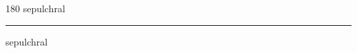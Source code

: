 
\begin{frame}
\begin{center}
\begin{turn}{180}
{\fontsize{2.5cm}{1em}\selectfont sepulchral}
\end{turn}
\vspace{1em}\par  
\hrule
\vspace{1em}\par  
{\fontsize{2.5cm}{1em}\selectfont sepulchral}
\end{center}
\end{frame}

